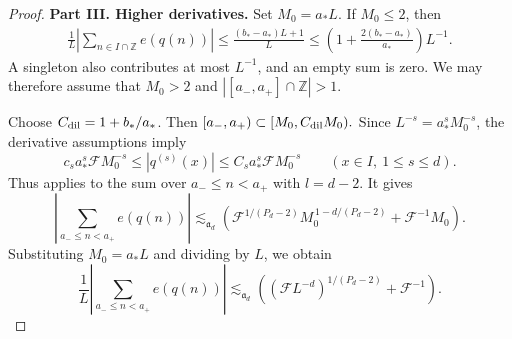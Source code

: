 \documentclass[reqno,12pt]{amsart}
\def \Z {\mathbb Z}
\numberwithin{equation}{section}
\begin{document}
\begin{proof}
\medskip
\noindent\textbf{Part III. Higher derivatives.}
Set
$M_0=a_*L$. If $M_0\le2$, then
\[
\begin{aligned}
\frac1L\left|\sum_{n\in I\cap\Z}e(q(n))\right|
\le \frac{(b_*-a_*)L+1}{L}
\le \left(1+\frac{2(b_*-a_*)}{a_*}\right)L^{-1}.
\end{aligned}
\]
A singleton also contributes at most $L^{-1}$, and an empty sum
is zero. We may therefore assume that $M_0>2$ and $|[a_{-},a_{+}]\cap \Z|>1$.

Choose $C_{\rm dil}=1+b_*/a_*$. Then
$
[a_-,a_+)\subset[M_0,C_{\rm dil}M_0).
$
Since $L^{-s}=a_*^sM_0^{-s}$, the derivative assumptions imply
\[
c_sa_*^s\mathcal F M_0^{-s}
\le |q^{(s)}(x)|
\le C_sa_*^s\mathcal F M_0^{-s}
\qquad(x\in I,\ 1\le s\le d).
\]
Thus \cite[Theorem~1.2]{LST2025} applies to the sum over
$a_-\le n<a_+$ with $l=d-2$. It gives
\[
\left|\sum_{a_-\le n<a_+}e(q(n))\right|
\lesssim_{\mathfrak a_d}
\left(
\mathcal F^{1/(P_d-2)}M_0^{\,1-d/(P_d-2)}
+\mathcal F^{-1}M_0
\right).
\]
Substituting $M_0=a_*L$ and dividing by $L$, we obtain
\[
\frac1L\left|\sum_{a_-\le n<a_+}e(q(n))\right|
\lesssim_{\mathfrak a_d}
\left(
(\mathcal F L^{-d})^{1/(P_d-2)}
+\mathcal F^{-1}
\right).
\]


\end{proof}
\end{document}
